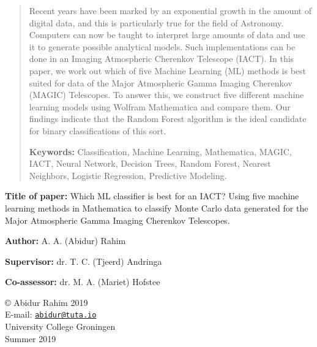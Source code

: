 \documentclass[a4paper, 12pt]{report}
\theoremstyle{definition}
\begin{document}



\begin{abstract}
    Recent years have been marked by an exponential growth in the amount of digital data, and this is particularly true for the field of Astronomy. Computers can now be taught to interpret large amounts of data and use it to generate possible analytical models. Such implementations can be done in an Imaging Atmospheric Cherenkov Telescope (IACT). In this paper, we work out which of five Machine Learning (ML) methods is best suited for data of the Major Atmospheric Gamma Imaging Cherenkov (MAGIC) Telescopes. To answer this, we construct five different machine learning models using Wolfram Mathematica and compare them. Our findings indicate that the Random Forest algorithm is the ideal candidate for binary classifications of this sort.
    
\bigskip
    
\textbf{Keywords:} Classification, Machine Learning, Mathematica, MAGIC, IACT, Neural Network, Decision Trees, Random Forest, Nearest Neighbors, Logistic Regression, Predictive Modeling.

\end{abstract}


\newpage

\vspace*{1cm}

\textbf{Title of paper:} Which ML classifier is best for an IACT? Using five machine learning methods in Mathematica to classify Monte Carlo data generated for the Major Atmospheric Gamma Imaging Cherenkov Telescopes.

\textbf{Author:} A. A. (Abidur) Rahim

\textbf{Supervisor:} dr. T. C. (Tjeerd) Andringa

\textbf{Co-assessor:} dr. M. A. (Mariet) Hofstee


\vfill

\begin{center}
© Abidur Rahim 2019 \\
E-mail: \texttt{\href{mailto:abidur@tuta.io}{abidur@tuta.io}}  \\
University College Groningen \\
Summer 2019
\end{center}
\end{document}
